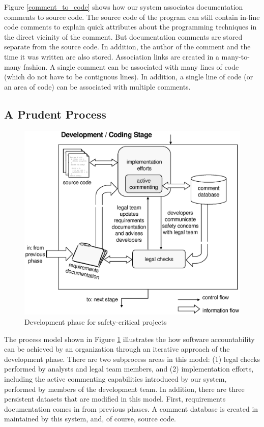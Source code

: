 Figure \ref{comment_to_code} shows how our system associates documentation
comments to source code. The source code of the program can still contain
in-line code comments to explain quick attributes about the programming
techniques in the direct vicinity of the comment. But documentation comments
are stored separate from the source code. In addition, the author of the
comment and the time it was written are also stored. Association links are
created in a many-to-many fashion. A single comment can be associated with many
lines of code (which do not have to be contiguous lines). In addition, a single
line of code (or an area of code) can be associated with multiple comments.

\subsection{A Prudent Process}

\begin{figure}[th]
\begin{narrow}{-1.25in}{0in}
\begin{center}
\includegraphics[scale=0.75]{images/prudence.eps}
\end{center}
\end{narrow}
\caption{Development phase for safety-critical projects}
\label{fig:prudence}
\end{figure}

The process model shown in Figure \ref{fig:prudence} illustrates the how
software accountability can be achieved by an organization through an iterative
approach of the development phase. There are two subprocess areas in this model:
(1) legal checks performed by analysts and legal team members, and (2)
implementation efforts, including the active commenting capabilities introduced
by our system, performed by members of the development team. In addition, there
are three persistent datasets that are modified in this model. First,
requirements documentation comes in from previous phases. A comment database is
created in maintained by this system, and, of course, source code.

